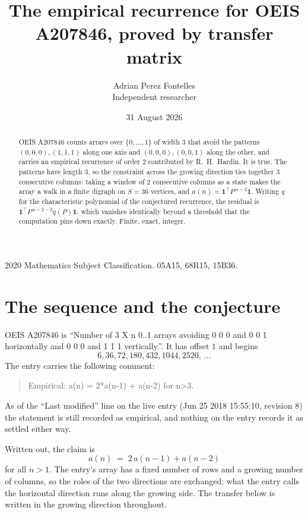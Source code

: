\documentclass[11pt,a4paper]{article}
\title{The empirical recurrence for OEIS A207846, proved by transfer matrix}
\author{Adrian Perez Fontelles\\ \small Independent researcher}
\date{31 August 2026}
\theoremstyle{plain}
\theoremstyle{definition}
\begin{document}
\maketitle

\begin{abstract}
OEIS A207846 counts arrays over $\{0,\dots,1\}$ of width $3$ that avoid the patterns
$(0,0,0), (1,1,1)$ along one axis and $(0,0,0), (0,0,1)$ along the other, and carries an empirical recurrence of
order $2$ contributed by R.~H.~Hardin. It is true. The patterns have length $3$, so
the constraint across the growing direction ties together $3$ consecutive columns: taking a
window of $2$ consecutive columns as a state makes the array a walk in a finite digraph
on $S=36$ vertices, and $a(n)=\mathbf{1}^{\!\top}P^{\,n-2}\mathbf{1}$. Writing $q$
for the characteristic polynomial of the conjectured recurrence, the residual is
$\mathbf{1}^{\!\top}P^{\,n-2-2}q(P)\mathbf{1}$, which vanishes identically
beyond a threshold that the computation pins down exactly. Finite, exact, integer.
\end{abstract}

\noindent\small 2020 Mathematics Subject Classification. 05A15, 68R15, 15B36.\normalsize

\section{The sequence and the conjecture}

OEIS A207846 is ``Number of 3 X n 0..1 arrays avoiding 0 0 0 and 0 0 1 horizontally and 0 0 0 and 1 1 1 vertically.''. It has offset
$1$ and begins
\[
6, 36, 72, 180, 432, 1044, 2520,\ \dots
\]
The entry carries the following comment:
\begin{quote}\small
Empirical: a(n) = 2*a(n-1) + a(n-2) for n>3.
\end{quote}
As of the ``Last modified'' line on the live entry (Jun 25 2018 15:55:10, revision
8) the statement is still recorded as empirical, and nothing on the entry
records it as settled either way.

Written out, the claim is
\begin{equation}\label{eq:conj}
a(n)\;=\;2\,a(n-1) + a(n-2)
\end{equation}
for all $n>1$. The entry's array has a fixed number of rows and a growing number of
columns, so the roles of the two directions are exchanged: what the entry calls the
horizontal direction runs along the growing side. The transfer below is written in the
growing direction throughout.
\end{document}
